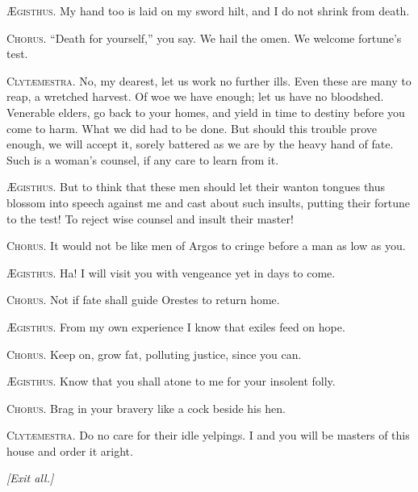 \documentclass[12pt]{article}
\begin{document}
\textsc{{\AE}gisthus.} My hand too is laid on my sword hilt, and I do not shrink from death.

\textsc{Chorus.} ``Death for yourself,'' you say. We hail the omen. We welcome fortune's test.

\textsc{Clyt{\ae}mestra.} No, my dearest, let us work no further ills. Even these are many to reap, a wretched harvest. Of woe we have enough; let us have no bloodshed. Venerable elders, go back to your homes, and yield in time to destiny before you come to harm. What we did had to be done. But should this trouble prove enough, we will accept it, sorely battered as we are by the heavy hand of fate. Such is a woman's counsel, if any care to learn from it.

\textsc{{\AE}gisthus.} But to think that these men should let their wanton tongues thus blossom into speech against me and cast about such insults, putting their fortune to the test! To reject wise counsel and insult their master!

\textsc{Chorus.} It would not be like men of Argos to cringe before a man as low as you.

\textsc{{\AE}gisthus.} Ha! I will visit you with vengeance yet in days to come.

\textsc{Chorus.} Not if fate shall guide Orestes to return home.

\textsc{{\AE}gisthus.} From my own experience I know that exiles feed on hope.

\textsc{Chorus.} Keep on, grow fat, polluting justice, since you can.

\textsc{{\AE}gisthus.} Know that you shall atone to me for your insolent folly.

\textsc{Chorus.} Brag in your bravery like a cock beside his hen.

\textsc{Clyt{\ae}mestra.} Do no care for their idle yelpings. I and you will be masters of this house and order it aright.

\begin{center}
\textit{[Exit all.]}
\end{center}
\end{document}
